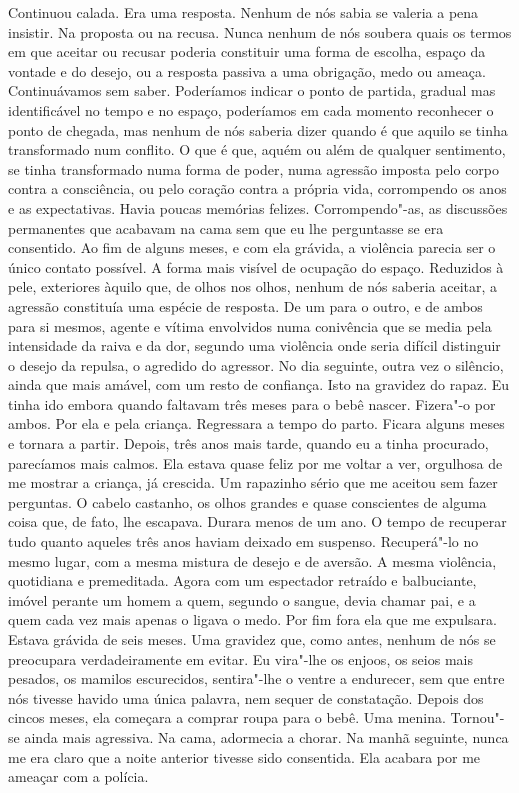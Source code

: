 Continuou calada. Era uma resposta. Nenhum de nós sabia se valeria a
pena insistir. Na proposta ou na recusa. Nunca nenhum de nós soubera
quais os termos em que aceitar ou recusar poderia constituir uma forma
de escolha, espaço da vontade e do desejo, ou a resposta passiva a uma
obrigação, medo ou ameaça. Continuávamos sem saber. Poderíamos indicar o
ponto de partida, gradual mas identificável no tempo e no espaço,
poderíamos em cada momento reconhecer o ponto de chegada, mas nenhum de
nós saberia dizer quando é que aquilo se tinha transformado num
conflito. O que é que, aquém ou além de qualquer sentimento, se tinha
transformado numa forma de poder, numa agressão imposta pelo corpo
contra a consciência, ou pelo coração contra a própria vida, corrompendo
os anos e as expectativas. Havia poucas memórias felizes.
Corrompendo"-as, as discussões permanentes que acabavam na cama sem que
eu lhe perguntasse se era consentido. Ao fim de alguns meses, e com ela
grávida, a violência parecia ser o único contato possível. A forma mais
visível de ocupação do espaço. Reduzidos à pele, exteriores àquilo que,
de olhos nos olhos, nenhum de nós saberia aceitar, a agressão constituía
uma espécie de resposta. De um para o outro, e de ambos para si mesmos,
agente e vítima envolvidos numa conivência que se media pela intensidade
da raiva e da dor, segundo uma violência onde seria difícil distinguir o
desejo da repulsa, o agredido do agressor. No dia seguinte, outra vez o
silêncio, ainda que mais amável, com um resto de confiança. Isto na
gravidez do rapaz. Eu tinha ido embora quando faltavam três meses
para o bebê nascer. Fizera"-o por ambos. Por ela e pela criança.
Regressara a tempo do parto. Ficara alguns meses e tornara a partir.
Depois, três anos mais tarde, quando eu a tinha procurado, parecíamos
mais calmos. Ela estava quase feliz por me voltar a ver, orgulhosa de me
mostrar a criança, já crescida. Um rapazinho sério que me aceitou sem
fazer perguntas. O cabelo castanho, os olhos grandes e quase conscientes
de alguma coisa que, de fato, lhe escapava. Durara menos de um ano. O
tempo de recuperar tudo quanto aqueles três anos haviam deixado em
suspenso. Recuperá"-lo no mesmo lugar, com a mesma mistura de desejo e
de aversão. A mesma violência, quotidiana e premeditada. Agora com um
espectador retraído e balbuciante, imóvel perante um homem a quem,
segundo o sangue, devia chamar pai, e a quem cada vez mais apenas o
ligava o medo. Por fim fora ela que me expulsara. Estava grávida de seis
meses. Uma gravidez que, como antes, nenhum de nós se preocupara
verdadeiramente em evitar. Eu vira"-lhe os enjoos, os seios mais
pesados, os mamilos escurecidos, sentira"-lhe o ventre a endurecer, sem
que entre nós tivesse havido uma única palavra, nem sequer de
constatação. Depois dos cincos meses, ela começara a comprar roupa para
o bebê. Uma menina. Tornou"-se ainda mais agressiva. Na cama, adormecia
a chorar. Na manhã seguinte, nunca me era claro que a noite anterior
tivesse sido consentida. Ela acabara por me ameaçar com a polícia.

